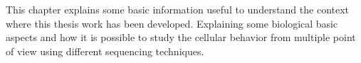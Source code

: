 This chapter explains some basic information useful to understand the context where this thesis work has been developed.
Explaining some biological basic aspects and how it is possible to study the cellular behavior from multiple point of view using different sequencing techniques.